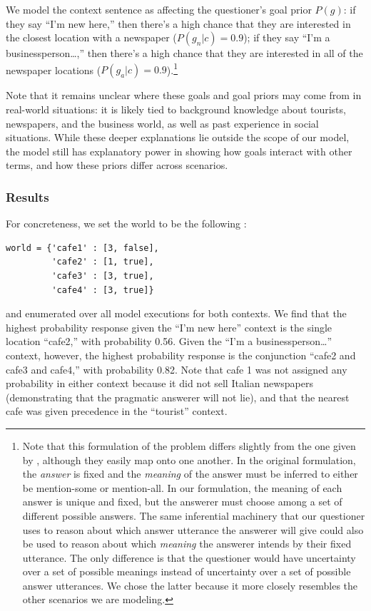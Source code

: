 \documentclass[12pt, floatsintext, jou]{apa6}
\begin{document}
We model the context sentence as affecting the questioner's goal prior $P(g)$: if they say ``I'm new here,'' then there's a high chance that they are interested in the closest location with a newspaper ($P(g_n | c) = 0.9$); if they say ``I'm a businessperson\dots,'' then there's a high chance that they are interested in all of the newspaper locations ($P(g_a | c) = 0.9$).\footnote{Note that this formulation of the problem differs slightly from the one given by , although they easily map onto one another. In the original formulation, the \emph{answer} is fixed and the \emph{meaning} of the answer must be inferred to either be mention-some or mention-all. In our formulation, the meaning of each answer is unique and fixed, but the answerer must choose among a set of different possible answers. The same inferential machinery that our questioner uses to reason about which answer utterance the answerer will give could also be used to reason about which \emph{meaning} the answerer intends by their fixed utterance. The only difference is that the questioner would have uncertainty over a set of possible meanings instead of uncertainty over a set of possible answer utterances. We chose the latter because it more closely resembles the other scenarios we are modeling.}

Note that it remains unclear where these goals and goal priors may come from in real-world situations: it is likely tied to background knowledge about tourists, newspapers, and the business world, as well as past experience in social situations. While these deeper explanations lie outside the scope of our model, the model still has explanatory power in showing how goals interact with other terms, and how these priors differ across scenarios. 


\subsubsection{Results}

For concreteness, we set the world to be the following :

\begin{lstlisting}
world = {'cafe1' : [3, false],
         'cafe2' : [1, true],
         'cafe3' : [3, true],
         'cafe4' : [3, true]}
\end{lstlisting}
and enumerated over all model executions for both contexts. We find that the highest probability response given the ``I'm new here'' context is the single location ``cafe2,'' with probability 0.56. Given the ``I'm a businessperson\dots'' context, however, the highest probability response is the conjunction ``cafe2 and cafe3 and cafe4,'' with probability 0.82. Note that cafe 1 was not assigned any probability in either context because it did not sell Italian newspapers (demonstrating that the pragmatic answerer will not lie), and that the nearest cafe was given precedence in the ``tourist'' context. 
\end{document}
